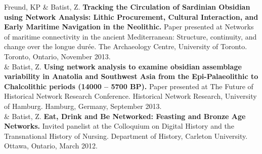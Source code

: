 \documentclass[11pt, a4paper]{article}
\newcommand{\LastName}{Batist}
\newcommand{\Initials}{Z}
\newcommand{\Me}{\LastName, \Initials}
\newcommand{\KyleFreund}{Freund, KP}
\newcommand{\Year}[1]{\fontsize{10pt}{0}\selectfont #1}
\begin{document}
\begin{EntriesTable}
  \KyleFreund { \&} \Me.
  \textbf{Tracking the Circulation of Sardinian Obsidian using Network Analysis: Lithic Procurement, Cultural Interaction, and Early Maritime Navigation in the Neolithic.}
  Paper presented at Networks of maritime connectivity in the ancient Mediterranean: Structure, continuity, and change over the longue durée. The Archaeology Centre, University of Toronto. Toronto, Ontario, November 2013.
  \\
\Year{2013}  &
  \Me.
  \textbf{Using network analysis to examine obsidian assemblage variability in Anatolia and Southwest Asia from the Epi-Palaeolithic to Chalcolithic periods (14000 – 5700 BP).}
  Paper presented at The Future of Historical Network Research Conference. Historical Network Research, University of Hamburg. Hamburg, Germany, September 2013.
  \\
\Year{2012}  &
  \Me.
  \textbf{Eat, Drink and Be Networked: Feasting and Bronze Age Networks.}
  Invited panelist at the Colloquium on Digital History and the Transnational History of Nursing. Department of History, Carleton University. Ottawa, Ontario, March 2012.
\end{EntriesTable}


\end{document}
